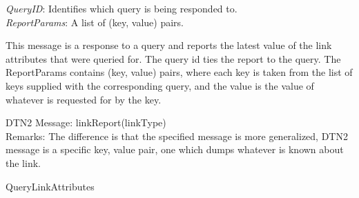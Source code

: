 {
\metP
    {\em QueryID}: Identifies which query is being responded to.\\
    {\em ReportParams}: A list of (key, value) pairs.

\metD
    This message is a response to a query and reports the latest value
    of the link attributes that were queried for.  The query id ties
    the report to the query. The ReportParams contains (key, value)
    pairs, where each key is taken from the list of keys supplied with
    the corresponding query, and the value is the value of whatever is
    requested for by the key.

\metM
    DTN2 Message: linkReport(linkType)\\
    Remarks: The difference is that the specified message is more generalized,
    DTN2 message is a specific key, value pair, one which dumps
    whatever is known about the link.

\metR
    QueryLinkAttributes
}
